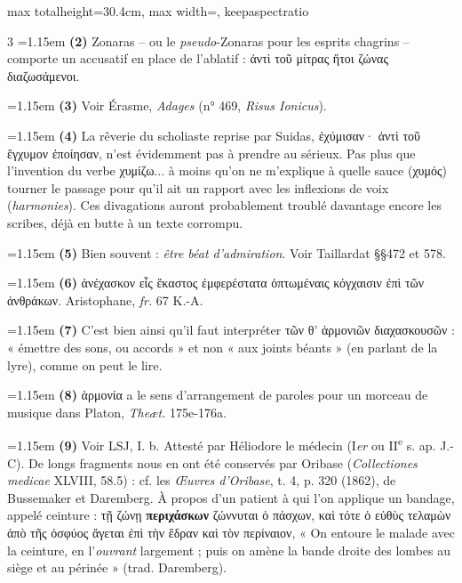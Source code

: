 \documentclass[11pt,twoside]{book}
\newcommand{\italique}[1]{\textit{#1}}
\newcommand{\nieme}[1]{#1\textsuperscript{e}}
\newcommand{\latin}[1]{\textit{#1}}
\newlength{\larg}
\begin{document}
\begin{adjustbox}{max totalheight=30.4cm, max width=\textwidth, keepaspectratio}
\begin{minipage}{\textwidth}
{\begin{multicols}{3}
\noindent\hangindent=1.15em {\color{sepiaNote}\textbf{(2)}} Zonaras -- ou le \italique{pseudo}-Zonaras pour les esprits chagrins -- comporte un accusatif en place de l'ablatif : ἀντὶ τοῦ μίτρας ἤτοι ζώνας διαζωσάμενοι.
\par\vspace{1.5pt}
\noindent\hangindent=1.15em {\color{sepiaNote}\textbf{(3)}} Voir Érasme, \italique{Adages} (n° 469, \latin{Risus Ionicus}).
\par\vspace{1.5pt}
\noindent\hangindent=1.15em {\color{sepiaNote}\textbf{(4)}} La rêverie du scholiaste reprise par Suidas, ἐχύμισαν· ἀντὶ τοῦ ἔγχυμον ἐποίησαν, n'est évidemment pas à prendre au sérieux. Pas plus que l'invention du verbe χυμίζω... à moins qu'on ne m'explique à quelle sauce (χυμός) tourner le passage pour qu'il ait un rapport avec les inflexions de voix (\italique{harmonies}). Ces divagations auront probablement troublé davantage encore les scribes, déjà en butte à un texte corrompu.
\par\vspace{1.5pt}
\noindent\hangindent=1.15em {\color{sepiaNote}\textbf{(5)}} Bien souvent : \italique{être béat d'admiration}. Voir Taillardat §§472 et 578.
\par\vspace{1.5pt}
\noindent\hangindent=1.15em {\color{sepiaNote}\textbf{(6)}} ἀνέχασκον εἷς ἕκαστος ἐμφερέστατα ὀπτωμέναις κόγχαισιν ἐπὶ τῶν ἀνθράκων. Aristophane, \italique{fr.} 67 K.-A.
\par\vspace{1.5pt}
\noindent\hangindent=1.15em {\color{sepiaNote}\textbf{(7)}} C'est bien ainsi qu'il faut interpréter τῶν θ' ἁρμονιῶν διαχασκουσῶν : « émettre des sons, ou accords » et non « aux joints béants » (en parlant de la lyre), comme on peut le lire.
\par\vspace{1.5pt}
\noindent\hangindent=1.15em {\color{sepiaNote}\textbf{(8)}} ἁρμονία a le sens d'arrangement de paroles pour un morceau de musique dans Platon, \italique{Theæt.} 175e-176a.
\par\vspace{1.5pt}
\noindent\hangindent=1.15em {\color{sepiaNote}\textbf{(9)}} Voir LSJ, I. b. Attesté par Héliodore le médecin (I\italique{er} ou \nieme{II} s. ap. J.-C). De longs fragments nous en ont été conservés par Oribase (\italique{Collectiones medicae} XLVIII, 58.5) : cf. les \italique{Œuvres d'Oribase}, t. 4, p. 320 (1862), de Bussemaker et Daremberg. À propos d'un patient à qui l'on applique un bandage, appelé ceinture : τῇ ζώνῃ \textbf{περιχάσκων} ζώννυται ὁ πάσχων, καὶ τότε ὁ εὐθὺς τελαμὼν ἀπὸ τῆς ὀσφύος ἄγεται ἐπὶ τὴν ἕδραν καὶ τὸν περίναιον, « On entoure le malade avec la ceinture, en l'\italique{ouvrant} largement ; puis on amène la bande droite des lombes au siège et au périnée » (trad. Daremberg).

\end{multicols}}
\end{minipage}
\end{adjustbox}
\end{document}
